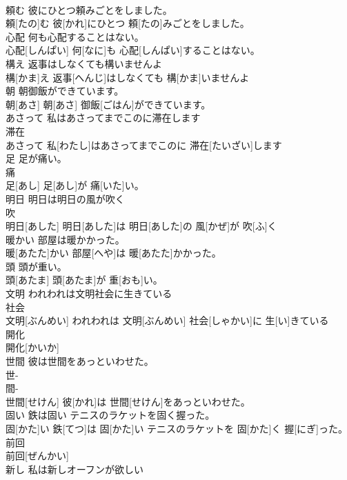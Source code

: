 \documentclass[8pt]{extreport}
\begin{document}
\begin{CJK}{UTF8}{min}
\\	頼む 彼にひとつ頼みごとをしました。	
\\	頼[たの]む 彼[かれ]にひとつ 頼[たの]みごとをしました。
\\	心配 何も心配することはない。	
\\	心配[しんぱい] 何[なに]も 心配[しんぱい]することはない。
\\	構え 返事はしなくても構いませんよ	
\\	構[かま]え 返事[へんじ]はしなくても 構[かま]いませんよ
\\	朝 朝御飯ができています。	
\\	朝[あさ] 朝[あさ] 御飯[ごはん]ができています。
\\	あさって 私はあさってまでこのに滞在します	
\\	滞在 
\\	あさって 私[わたし]はあさってまでこのに 滞在[たいざい]します
\\	足 足が痛い。	
\\	痛 
\\	足[あし] 足[あし]が 痛[いた]い。
\\	明日 明日は明日の風が吹く	
\\	吹 
\\	明日[あした] 明日[あした]は 明日[あした]の 風[かぜ]が 吹[ふ]く
\\	暖かい 部屋は暖かかった。	
\\	暖[あたた]かい 部屋[へや]は 暖[あたた]かかった。
\\	頭 頭が重い。	
\\	頭[あたま] 頭[あたま]が 重[おも]い。
\\	文明 われわれは文明社会に生きている	
\\	社会
\\	文明[ぶんめい] われわれは 文明[ぶんめい] 社会[しゃかい]に 生[い]きている
\\	開化	
\\	開化[かいか]
\\	世間 彼は世間をあっといわせた。	
\\	世-
\\	間-
\\	世間[せけん] 彼[かれ]は 世間[せけん]をあっといわせた。
\\	固い 鉄は固い テニスのラケットを固く握った。	
\\	固[かた]い 鉄[てつ]は 固[かた]い テニスのラケットを 固[かた]く 握[にぎ]った。
\\	前回	
\\	前回[ぜんかい]
\\	新し 私は新しオーフンが欲しい	

\end{CJK}
\end{document}
